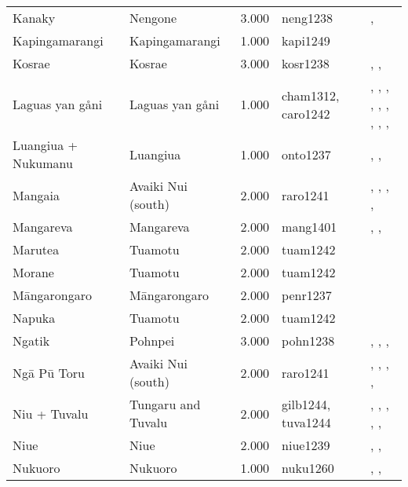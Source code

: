 \begin{longtable}{p{1.8cm}p{1.8cm}p{1.8cm}p{2cm}p{7cm}}
  Kanaky & Nengone & 3.000 & neng1238 & \citet{dubois1984gens}, \citet{guiart1952organisation} \\ 
  Kapingamarangi & Kapingamarangi & 1.000 & kapi1249 & \citet{buck1950} \\ 
  Kosrae & Kosrae & 3.000 & kosr1238 & \citet{athens2007prehistoric}, \citet{graves1986late}, \citet{peoples1991} \\ 
  Laguas yan gåni & Laguas yan gåni & 1.000 & cham1312, caro1242 & \citet{cordy1983social}, \citet{cordy1983social}, \citet{cordy1983social}, \citet{thompson_1971}, \citet{thompson_1971}, \citet{thompson_1971}, \citet{josephandmurray1951}, \citet{josephandmurray1951}, \citet{spehr1954}, \citet{spehr1954} \\ 
  Luangiua + Nukumanu & Luangiua & 1.000 & onto1237 & \citet{sahlins1958social}, \citet{bayliss1974constraints}, \citet{donner1991} \\ 
  Mangaia & Avaiki Nui (south) & 2.000 & raro1241 & \citet{bellwood1971varieties}, \citet{buck1934}, \citet{crocombe_1967}, \citet{hayes1981cook}, \citet{walter1996} \\ 
  Mangareva & Mangareva & 2.000 & mang1401 & \citet{buck1938}, \citet{conte2004archaeological}, \citet{green2000mangarevan} \\ 
  Marutea & Tuamotu & 2.000 & tuam1242 & \citet{emory1975material} \\ 
  Morane & Tuamotu & 2.000 & tuam1242 & \citet{emory1975material} \\ 
  Māngarongaro & Māngarongaro & 2.000 & penr1237 & \citet{buck1932b} \\ 
  Napuka & Tuamotu & 2.000 & tuam1242 & \citet{emory1975material} \\ 
  Ngatik & Pohnpei & 3.000 & pohn1238 & \citet{hanlon2019upon}, \citet{haun1984prehistoric}, \citet{raynor1991indigenous}, \citet{riesenberg1968native} \\ 
  Ngā Pū Toru & Avaiki Nui (south) & 2.000 & raro1241 & \citet{bellwood1971varieties}, \citet{buck1934}, \citet{crocombe_1967}, \citet{hayes1981cook}, \citet{walter1996} \\ 
  Niu + Tuvalu & Tungaru and Tuvalu & 2.000 & gilb1244, tuva1244 & \citet{lambert1966}, \citet{lambert1975makin}, \citet{lambert1991}, \citet{macdonald1982cinderellas}, \citet{macdonald1982cinderellas}, \citet{goldsmith1991} \\ 
  Niue & Niue & 2.000 & niue1239 & \citet{loeb1978}, \citet{smith1983niue}, \citet{walter_anderson1995} \\ 
  Nukuoro & Nukuoro & 1.000 & nuku1260 & \citet{carroll1966nukuoro}, \citet{carroll1975pacific}, \citet{eilers_1934} \\ 

\end{longtable}
